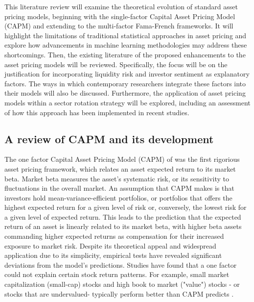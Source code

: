 This literature review will examine the theoretical evolution of standard asset pricing models, beginning with the single-factor Capital Asset Pricing Model (CAPM) and extending to the multi-factor Fama-French frameworks. It will highlight the limitations of traditional statistical approaches in asset pricing and explore how advancements in machine learning methodologies may address these shortcomings. Then, the existing literature of the proposed enhancements to the asset pricing models will be reviewed. Specifically, the focus will be on the justification for incorporating liquidity risk and investor sentiment as explanatory factors. The ways in which contemporary researchers integrate these factors into their models will also be discussed. Furthermore, the application of asset pricing models within a sector rotation strategy will be explored, including an assessment of how this approach has been implemented in recent studies.


\subsection{A review of CAPM and its development}

The one factor Capital Asset Pricing Model (CAPM) of  was the first rigorious asset pricing framework, which relates an asset expected return to its market beta. Market beta measures the asset's systematic risk, or its sensitivity to fluctuations in the overall market. An assumption that CAPM makes is that investors hold mean-variance-efficient portfolios, or portfolios that offers the highest expected return for a given level of risk or, conversely, the lowest risk for a given level of expected return. This leads to the prediction that the expected return of an asset is linearly related to its market beta, with higher beta assets commanding higher expected returns as compensation for their increased exposure to market risk. Despite its theoretical appeal and widespread application due to its simplicity, empirical tests have revealed significant deviations from the model's predictions. Studies have found that a one factor could not explain certain stock return patterns. For example, small market capitalization (small-cap) stocks and high book to market ("value") stocks - or stocks that are undervalued- typically perform better than CAPM predicts \cite{capm_2004}.

